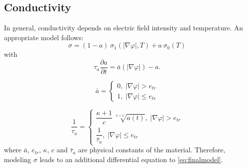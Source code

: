 \documentclass[11pt,a4paper]{article}
\begin{document}
\subsection{Conductivity}
In general, conductivity depends on electric field intensity and temperature. An appropriate model follows:
\begin{equation}\label{eq:conductivitymodel}
	\sigma = (1-a)\ \sigma_{1} \left(|\nabla \varphi|, T \right) +
	a\ \sigma_{0} \left( T \right)
\end{equation}
with 
\begin{equation}\label{eq:conductivitymodelaux}
	\tau_{a} \dfrac{\partial a}{\partial t} = \bar{a}\left(|\nabla \varphi|\right) - a.
\end{equation}

\[
\bar{a} = \begin{cases}
	0, \; |\nabla \varphi| > e_{tr}\\[3mm]
	1, \; |\nabla \varphi| \le e_{tr}
\end{cases}
\]

\[
\dfrac{1}{\tau_{a}} = \begin{cases}
	\dfrac{\kappa+1}{c}\ \sqrt[\kappa+1]{a(t)}, \; |\nabla \varphi| > e_{tr}\\[3mm]
	\dfrac{1}{\bar{\tau}_{a}}, \; |\nabla \varphi| \le e_{tr}
\end{cases}
\]
where \(\bar{a}\), \(e_{tr}\), \(\kappa\), \(c\) and \(\bar{\tau}_a\) are physical constants of the material. Therefore, modeling \(\sigma\) leads to an additional differential equation to \eqref{eq:finalmodel}.
\end{document}
